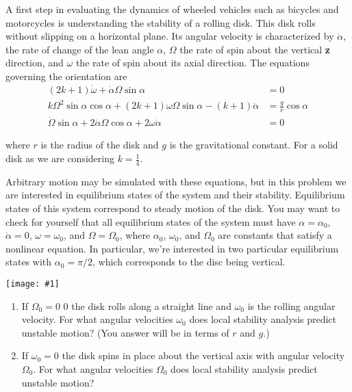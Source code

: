 \documentclass[12pt,letterpaper]{hmcpset}
\newcommand{\diagram}[2]{\begin{center}\texttt{[image: \#1]}\end{center}}
\begin{document}
	\newpage
	
	\begin{problem}[2]
		A first step in evaluating the dynamics of wheeled vehicles such as bicycles and motorcycles is
		understanding the stability of a rolling disk. This disk rolls without slipping on a horizontal
		plane. Its angular velocity is characterized by $\dot{\alpha}$, the rate of change of the lean angle $\alpha$, $\Omega$ the
		rate of spin about the vertical \textbf{z} direction, and $\omega$ the rate of spin about its axial direction.
		The equations governing the orientation are
		\begin{displaymath}
		\begin{split}
		(2k+1)\dot{\omega} + \dot{\alpha}\Omega \sin\alpha &= 0\\
		k\Omega^2 \sin\alpha \cos\alpha + (2k+1)\omega\Omega \sin\alpha - (k+1)\ddot{\alpha} &= \frac{g}{r} \cos\alpha\\
		\dot{\Omega} \sin\alpha + 2\dot{\alpha} \Omega\cos\alpha + 2\omega\dot{\alpha} &= 0
		\end{split}
		\end{displaymath}
		
		where $r$ is the radius of the disk and $g$ is the gravitational constant. For a solid disk as we are
		considering $k = \frac{1}{4}$.
		
		Arbitrary motion may be simulated with these equations, but in this problem we are interested
		in equilibrium states of the system and their stability. Equilibrium states of this system
		correspond to steady motion of the disk. You may want to check for yourself that all
		equilibrium states of the system must have $\alpha = \alpha_0$, $\dot\alpha = 0$, $\omega = \omega_0$, and $\Omega = \Omega_0$, where $\alpha_0$, $\omega_0$, and $\Omega_0 $ are constants that satisfy a nonlinear equation. In particular, we're interested in two
		particular equilibrium states with $\alpha_0 = \pi/2$, which corresponds to the disc being vertical.
		
		\diagram{Disk}{3}
		
		\begin{enumerate}
			\item If $\Omega_0 = 0$ 0 the disk rolls along a straight line and $\omega_0$ is the rolling angular velocity. For
			what angular velocities $\omega_0$ does local stability analysis predict unstable motion? (You
			answer will be in terms of $r$ and $g$.)
			
			\item If $ \omega_0 = 0 $ the disk spins in place about the vertical axis with angular velocity $\Omega_0$. For
			what angular velocities $\Omega_0$ does local stability analysis predict unstable motion?
		\end{enumerate}
	\end{problem}
	
\end{document}
